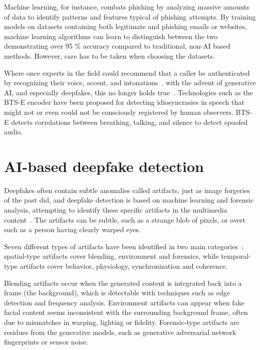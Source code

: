 Machine learning, for instance, combats phishing by analyzing massive amounts of data to identify patterns and features typical of phishing attempts. By training models on datasets containing both legitimate and phishing emails or websites, machine learning algorithms can learn to distinguish between the two demonstrating over 95 \% accuracy compared to traditional, non-AI based methods. However, care has to be taken when choosing the datasets.


Where once experts in the field could recommend that a caller be authenticated by recognizing their voice, accent, and intonations~\citep{mitnick_The_Art_of_Deception_2003}, with the advent of generative AI, and especially deepfakes, this no longer holds true~\citep{doan_BTSE_Audio_Deepfake_Detection_2023}. Technologies such as the BTS-E encoder have been proposed for detecting idiosyncrasies in speech that might not or even could not be consciously registered by human observers. BTS-E detects correlations between breathing, talking, and silence to detect spoofed audio.

\section{AI-based deepfake detection}
\begin{comment}
  -
\end{comment}

Deepfakes often contain subtle anomalies called artifacts, just as image forgeries of the past did, and deepfake detection is based on machine learning and forensic analysis, attempting to identify these specific artifacts in the multimedia content~\citep{mirsky_Creation_Detection_Deepfakes_2021}. The artifacts can be subtle, such as a strange blob of pixels, or overt such as a person having clearly warped eyes.

Seven different types of artifacts have been identified in two main categories~\citep{mirsky_Creation_Detection_Deepfakes_2021}: spatial-type artifacts cover blending, environment and forensics, while temporal-type artifacts cover behavior, physiology, synchronization and coherence.

Blending artifacts occur when the generated content is integrated back into a frame (the background), which is detectable with techniques such as edge detection and frequency analysis. Environment artifacts can appear when fake facial content seems inconsistent with the surrounding background frame, often due to mismatches in warping, lighting or fidelity. Forensic-type artifacts are residues from the generative models, such as generative adversarial network fingerprints or sensor noise.

